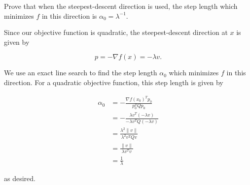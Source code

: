 Prove that when the steepest-descent direction is used, the step length which minimizes $f$ in this direction is 
$\alpha_0 = \lambda^{-1}$.

\begin{solution}
    Since our objective function is quadratic, the steepest-descent direction at $x$ is given by

    $$
    p = - \nabla f(x) = - \lambda v.
    $$

    We use an exact line search to find the step length $\alpha_0$ which minimizes $f$ in this direction. For a quadratic
    objective function, this step length is given by

    \begin{align*}
        \alpha_0 &= -\frac{\nabla f(x_0)^T p_0}{p_0^T Q p_0} \\
                 &= -\frac{\lambda v^T \left( -\lambda v \right)}{-\lambda v^T Q (-\lambda v)} \\
                 &= \frac{\lambda^2 \lVert v \rVert}{\lambda^2 v^T Q v} \\
                 &= \frac{\lVert v \rVert}{\lambda v^T v} \\
                 &= \frac{1}{\lambda}
    \end{align*}

    as desired.
    \ \\
\end{solution}